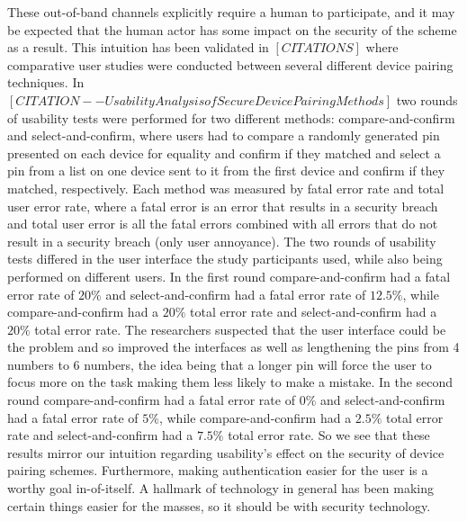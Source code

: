 \documentclass[12pt,dvips]{report}
\begin{document}
These out-of-band channels explicitly require a human to participate, and it may be expected that the human actor has some impact on the security of the scheme as a result. This intuition has been validated in $[CITATIONS]$ where comparative user studies were conducted between several different device pairing techniques. In $[CITATION--Usability Analysis of Secure Device Pairing Methods]$ two rounds of usability tests were performed for two different methods: compare-and-confirm and select-and-confirm, where users had to compare a randomly generated pin presented on each device for equality and confirm if they matched and select a pin from a list on one device sent to it from the first device and confirm if they matched, respectively. Each method was measured by fatal error rate and total user error rate, where a fatal error is an error that results in a security breach and total user error is all the fatal errors combined with all errors that do not result in a security breach (only user annoyance). The two rounds of usability tests differed in the user interface the study participants used, while also being performed on different users. In the first round compare-and-confirm had a fatal error rate of $20\%$ and select-and-confirm had a fatal error rate of $12.5\%$, while compare-and-confirm had a $20\%$ total error rate and select-and-confirm had a $20\%$ total error rate. The researchers suspected that the user interface could be the problem and so improved the interfaces as well as lengthening the pins from 4 numbers to 6 numbers, the idea being that a longer pin will force the user to focus more on the task making them less likely to make a mistake. In the second round compare-and-confirm had a fatal error rate of $0\%$ and select-and-confirm had a fatal error rate of $5\%$, while compare-and-confirm had a $2.5\%$ total error rate and select-and-confirm had a $7.5\%$ total error rate. So we see that these results mirror our intuition regarding usability's effect on the security of device pairing schemes. Furthermore, making authentication easier for the user is a worthy goal in-of-itself. A hallmark of technology in general has been making certain things easier for the masses, so it should be with security technology. 
\end{document}
